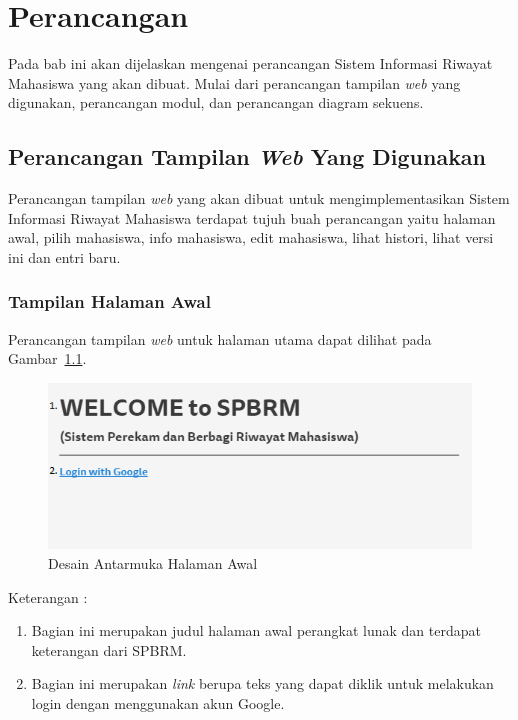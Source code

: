 \chapter{Perancangan}
\label{chap:perancangan}

Pada bab ini akan dijelaskan mengenai perancangan Sistem Informasi Riwayat
Mahasiswa yang akan dibuat. Mulai dari perancangan tampilan {\it web} yang digunakan,
perancangan modul, dan perancangan diagram sekuens.

\section{Perancangan Tampilan {\it Web} Yang Digunakan}
\label{sec:perancanganantarmuka}

Perancangan tampilan {\it web} yang akan dibuat untuk mengimplementasikan Sistem
Informasi Riwayat Mahasiswa terdapat tujuh buah perancangan yaitu halaman
awal, pilih mahasiswa, info mahasiswa, edit mahasiswa, lihat histori, lihat
versi ini dan entri baru.

\subsection{Tampilan Halaman Awal}
Perancangan tampilan {\it web} untuk halaman utama dapat dilihat pada
Gambar~\ref{fig:halamanawal}.

\begin{figure}[ht]
\centering
\includegraphics[scale=0.9]{Gambar/halamanawal.png}
\caption[Desain Antarmuka Halaman Awal]{Desain Antarmuka Halaman Awal}
\label{fig:halamanawal}
\end{figure}

Keterangan :
\begin{enumerate}[(1)]
\item
Bagian ini merupakan judul halaman awal perangkat lunak dan terdapat keterangan dari SPBRM.
\item
Bagian ini merupakan {\it link} berupa teks yang dapat diklik untuk melakukan login dengan menggunakan akun Google.
\end{enumerate}

